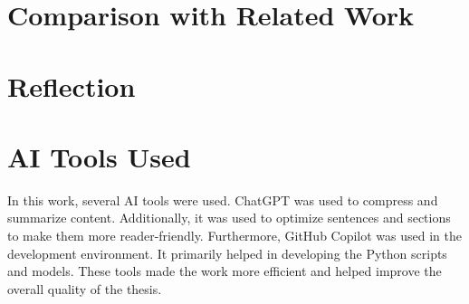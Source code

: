\section{Comparison with Related Work}
\label{sec:ComparisonRelatedWork}

\section{Reflection}
\label{sec:Reflection}

\section{AI Tools Used}
\label{sec:AIToolsUsed}
In this work, several AI tools were used. ChatGPT was used to compress and summarize content. Additionally, it was used to optimize sentences and sections to make them more reader-friendly. Furthermore, GitHub Copilot was used in the development environment. It primarily helped in developing the Python scripts and models. These tools made the work more efficient and helped improve the overall quality of the thesis.